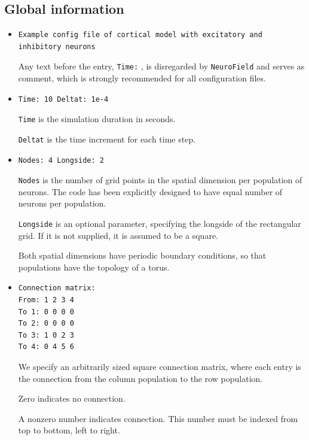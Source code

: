 \documentclass[12pt,a4paper]{article}
\newcommand{\type}[1]{ {\small\small\tt #1} }
\newcommand{\NF}[0]{ \type{NeuroField}}
\begin{document}
\subsection{Global information}
\label{sec:global}
\begin{itemize}

\item
\begin{lstlisting}
Example config file of cortical model with excitatory and inhibitory neurons
\end{lstlisting}
Any text before the entry, \type{Time:}, is disregarded by \NF and serves as comment, which is strongly recommended for all configuration files.
\item
\begin{lstlisting}
Time: 10 Deltat: 1e-4
\end{lstlisting}
\type{Time} is the simulation duration in seconds.

\type{Deltat} is the time increment for each time step.
\item
\begin{lstlisting}
Nodes: 4 Longside: 2
\end{lstlisting}
\type{Nodes} is the number of grid points in the spatial dimension per population of neurons. The code has been explicitly designed to have equal number of neurons per population.

\type{Longside} is an optional parameter, specifying the longside of the rectangular grid. If it is not supplied, it is assumed to be a square.

Both spatial dimensions have periodic boundary conditions, so that populations have the topology of a torus.
\item
\begin{lstlisting}
Connection matrix:
From: 1 2 3 4
To 1: 0 0 0 0
To 2: 0 0 0 0
To 3: 1 0 2 3
To 4: 0 4 5 6
\end{lstlisting}
We specify an arbitrarily sized square connection matrix, where each entry is the connection from the column population to the row population.

Zero indicates no connection.

A nonzero number indicates connection. This number must be indexed from top to bottom, left to right.
\end{itemize}
\end{document}
